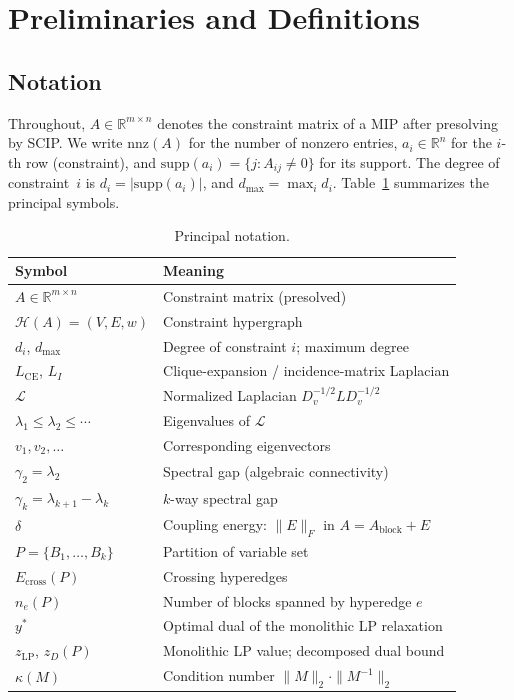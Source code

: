 \documentclass[12pt]{article}
\begin{document}
\section{Preliminaries and Definitions}
\label{sec:prelim}

\subsection{Notation}

Throughout, $A \in \mathbb{R}^{m \times n}$ denotes the constraint matrix of a MIP
after presolving by SCIP.  We write $\mathrm{nnz}(A)$ for the number of nonzero
entries, $a_i \in \mathbb{R}^n$ for the $i$-th row (constraint), and
$\mathrm{supp}(a_i) = \{j : A_{ij} \neq 0\}$ for its support.  The degree of
constraint~$i$ is $d_i = |\mathrm{supp}(a_i)|$, and $d_{\max} = \max_i d_i$.
Table~\ref{tab:notation} summarizes the principal symbols.

\begin{table}[ht]
\centering
\caption{Principal notation.}
\label{tab:notation}
\small
\begin{tabular}{@{}ll@{}}
\toprule
Symbol & Meaning \\
\midrule
$A \in \mathbb{R}^{m \times n}$ & Constraint matrix (presolved) \\
$\mathcal{H}(A) = (V, E, w)$ & Constraint hypergraph \\
$d_i$, $d_{\max}$ & Degree of constraint $i$; maximum degree \\
$L_{\mathrm{CE}}$, $L_I$ & Clique-expansion / incidence-matrix Laplacian \\
$\mathcal{L}$ & Normalized Laplacian $D_v^{-1/2} L D_v^{-1/2}$ \\
$\lambda_1 \leq \lambda_2 \leq \cdots$ & Eigenvalues of $\mathcal{L}$ \\
$v_1, v_2, \ldots$ & Corresponding eigenvectors \\
$\gamma_2 = \lambda_2$ & Spectral gap (algebraic connectivity) \\
$\gamma_k = \lambda_{k+1} - \lambda_k$ & $k$-way spectral gap \\
$\delta$ & Coupling energy: $\|E\|_F$ in $A = A_{\mathrm{block}} + E$ \\
$P = \{B_1, \ldots, B_k\}$ & Partition of variable set \\
$E_{\mathrm{cross}}(P)$ & Crossing hyperedges \\
$n_e(P)$ & Number of blocks spanned by hyperedge $e$ \\
$y^*$ & Optimal dual of the monolithic LP relaxation \\
$z_{\mathrm{LP}}$, $z_D(P)$ & Monolithic LP value; decomposed dual bound \\
$\kappa(M)$ & Condition number $\|M\|_2 \cdot \|M^{-1}\|_2$ \\
\bottomrule
\end{tabular}
\end{table}
\end{document}
